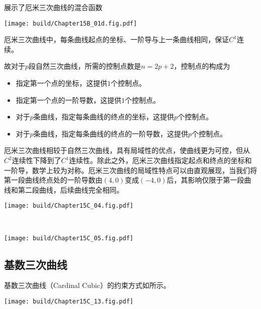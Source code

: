 展示了厄米三次曲线的混合函数
\begin{Figure}[厄米三次曲线的混合函数]
    \texttt{[image: build/Chapter15B\_01d.fig.pdf]}
\end{Figure}

厄米三次曲线中，每条曲线起点的坐标、一阶导与上一条曲线相同，保证$C^1$连续。

故对于$p$段自然三次曲线，所需的控制点数是$n=2p+2$，控制点的构成为
\begin{itemize}
    \item 指定第一个点的坐标，这提供$1$个控制点。
    \item 指定第一个点的一阶导数，这提供$1$个控制点。
    \item 对于$p$条曲线，指定每条曲线的终点的坐标，这提供$p$个控制点。
    \item 对于$p$条曲线，指定每条曲线的终点的一阶导数，这提供$p$个控制点。
\end{itemize}
厄米三次曲线相较于自然三次曲线，具有局域性的优点，使曲线更为可控，但从$C^2$连续性下降到了$C^1$连续性。除此之外，厄米三次曲线指定起点和终点的坐标和一阶导，数学上较为对称。厄米三次曲线的局域性特点可以由直观展现，当我们将第一段曲线终点处的一阶导数由$(4,0)$变成$(-4,0)$后，其影响仅限于第一段曲线和第二段曲线，后续曲线完全相同。

\begin{Figure}[厄米三次曲线构成的分段曲线]
    \begin{FigureSub}[设定1;自然设定1]
        \texttt{[image: build/Chapter15C\_04.fig.pdf]}
    \end{FigureSub}\\ \vspace{0.25cm}
    \begin{FigureSub}[设定2;自然设定2]
        \texttt{[image: build/Chapter15C\_05.fig.pdf]}
    \end{FigureSub}
\end{Figure}

\subsection{基数三次曲线}
基数三次曲线（Cardinal Cubic）的约束方式如所示。

\begin{Figure}[基数三次曲线]
    \texttt{[image: build/Chapter15C\_13.fig.pdf]}
\end{Figure}

